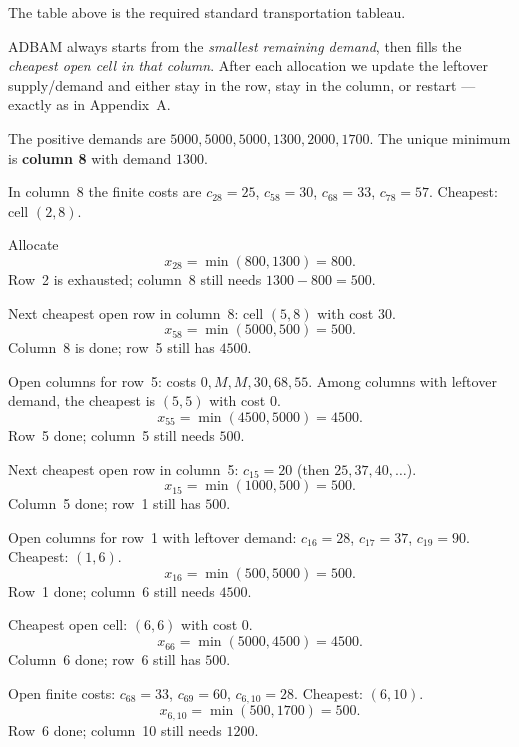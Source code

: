 \begin{resultbox}[title={Part (b)}]
The table above is the required standard transportation tableau.
\end{resultbox}


\begin{ideabox}
ADBAM always starts from the \emph{smallest remaining demand}, then fills the
\emph{cheapest open cell in that column}. After each allocation we update the leftover
supply/demand and either stay in the row, stay in the column, or restart --- exactly as
in Appendix~A.
\end{ideabox}

The positive demands are \(5000,5000,5000,1300,2000,1700\). The unique minimum is
\textbf{column 8} with demand \(1300\).

In column~8 the finite costs are \(c_{28}=25\), \(c_{58}=30\), \(c_{68}=33\), \(c_{78}=57\).
Cheapest: cell \((2,8)\).

Allocate
\[
  x_{28}=\min(800,1300)=800.
\]
Row~2 is exhausted; column~8 still needs \(1300-800=500\).

Next cheapest open row in column~8: cell \((5,8)\) with cost \(30\).
\[
  x_{58}=\min(5000,500)=500.
\]
Column~8 is done; row~5 still has \(4500\).

Open columns for row~5: costs \(0,M,M,30,68,55\). Among columns with leftover demand,
the cheapest is \((5,5)\) with cost \(0\).
\[
  x_{55}=\min(4500,5000)=4500.
\]
Row~5 done; column~5 still needs \(500\).

Next cheapest open row in column~5: \(c_{15}=20\) (then \(25,37,40,\ldots\)).
\[
  x_{15}=\min(1000,500)=500.
\]
Column~5 done; row~1 still has \(500\).

Open columns for row~1 with leftover demand: \(c_{16}=28\), \(c_{17}=37\), \(c_{19}=90\).
Cheapest: \((1,6)\).
\[
  x_{16}=\min(500,5000)=500.
\]
Row~1 done; column~6 still needs \(4500\).

Cheapest open cell: \((6,6)\) with cost \(0\).
\[
  x_{66}=\min(5000,4500)=4500.
\]
Column~6 done; row~6 still has \(500\).

Open finite costs: \(c_{68}=33\), \(c_{69}=60\), \(c_{6,10}=28\). Cheapest: \((6,10)\).
\[
  x_{6,10}=\min(500,1700)=500.
\]
Row~6 done; column~10 still needs \(1200\).

